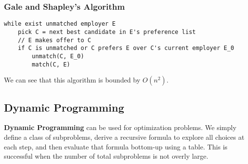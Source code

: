 \documentclass[12pt]{article}
\begin{document}
\subsubsection{Gale and Shapley's Algorithm}
\begin{verbatim}
while exist unmatched employer E
    pick C = next best candidate in E's preference list
    // E makes offer to C
    if C is unmatched or C prefers E over C's current employer E_0
        unmatch(C, E_0)
        match(C, E)
\end{verbatim}
We can see that this algorithm is bounded by $O(n^2)$.

\subsection{Dynamic Programming}
{\bf Dynamic Programming} can be used for optimization problems. We simply define a class of subproblems, derive a recursive formula to explore all choices at each step, and then evaluate that formula bottom-up using a table. This is successful when the number of total subproblems is not overly large.

\end{document}
